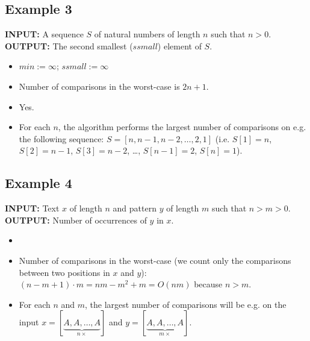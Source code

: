 \documentclass[english,twoside]{article}
\begin{document}
\subsection*{Example 3}

{\bf INPUT:} A sequence $S$ of natural numbers of length $n$ such that
$n > 0$. \\
{\bf OUTPUT:} The second smallest ($ssmall$) element of $S$.\\

\begin{itemize}
\item
 \begin{algorithmic}
   \STATE $min :=  \infty$; $ssmall := \infty$
	   \ELSE
	   \ENDIF
	 \ENDIF  
   \ENDFOR
   \ELSE
   \ENDIF
 \end{algorithmic}

 
\item Number of comparisons in the worst-case is $2n+1$.
\item Yes.
\item For each $n$, the algorithm performs the largest number of comparisons
on e.g. the following sequence: $S=[n, n-1, n-2, \ldots, 2, 1]$
 (i.e. $S[1]=n$, $S[2]=n-1$, $S[3]=n-2$, \ldots, $S[n-1]=2$, $S[n]=1$).
\end{itemize}

\subsection*{Example 4}

{\bf INPUT:} Text  $x$ of length $n$ and pattern $y$ of length $m$ such that
 $n > m > 0$.\\
{\bf OUTPUT:} Number of occurrences of $y$ in $x$.\\

\begin{itemize}
\item
  \begin{algorithmic}
	\ENDWHILE
	  
        \ENDIF
  \ENDFOR
  \end{algorithmic}

\item Number of comparisons in the worst-case (we count only the comparisons
between two positions in $x$ and $y$): 
$(n-m+1)\cdot m = nm - m^2 + m = O(nm)$ because $n>m$.

\item For each $n$ and $m$,  the largest number of comparisons 
will be e.g. on the input $x=[\underbrace{A, A,\ldots, A}_{n \times}]$
and $y=[\underbrace{A, A, \ldots, A}_{m \times}]$.
\end{itemize}
\end{document}
